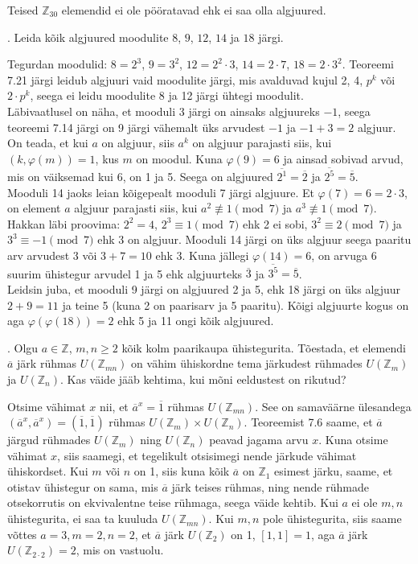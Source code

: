 \documentclass[a4paper, 10pt]{article}
\newcommand{\Z}{\mathbb{Z}}
\newcommand{\w}{\overline}
\begin{document}
Teised $\Z_{30}$ elemendid ei ole pööratavad ehk ei saa olla algjuured.
\bigskip
\pagebreak

. Leida kõik algjuured moodulite $8$, $9$, $12$, $14$ ja $18$ järgi. 

\bigskip
Tegurdan moodulid: $8=2^3$, $9=3^2$, $12=2^2\cdot3$, $14=2\cdot7$, $18=2\cdot3^2$. Teoreemi 7.21 järgi leidub algjuuri vaid moodulite järgi, mis avalduvad kujul 2, 4, $p^k$ või $2\cdot p^k$, seega ei leidu moodulite 8 ja 12 järgi ühtegi moodulit.\\
\indent Läbivaatlusel on näha, et mooduli 3 järgi on ainsaks algjuureks $-1$, seega teoreemi 7.14 järgi on 9 järgi vähemalt üks arvudest $-1$ ja $-1+3=2$ algjuur. On teada, et kui $a$ on algjuur, siis $a^k$ on algjuur parajasti siis, kui $(k,\varphi(m))=1$, kus $m$ on moodul. Kuna $\varphi(9)=6$ ja ainsad sobivad arvud, mis on väiksemad kui 6, on 1 ja 5. Seega on algjuured $\w{2^1}=\w2$ ja $\w{2^5}=\w5$.\\
\indent Mooduli 14 jaoks leian kõigepealt mooduli 7 järgi algjuure. Et $\varphi(7)=6=2\cdot3$, on element $a$ algjuur parajasti siis, kui $a^2\not\equiv1\pmod7$ ja $a^3\not\equiv1\pmod7$. Hakkan läbi proovima: $2^2=4$, $2^3\equiv1\pmod7$ ehk 2 ei sobi, $3^2\equiv2\pmod7$ ja $3^3\equiv-1\pmod7$ ehk 3 on algjuur. Mooduli 14 järgi on üks algjuur seega paaritu arv arvudest 3 või $3+7=10$ ehk 3. Kuna jällegi $\varphi(14)=6$, on arvuga 6 suurim ühistegur arvudel 1 ja 5 ehk algjuurteks $\w3$ ja $\w{3^5}=\w5$.\\
\indent Leidsin juba, et mooduli 9 järgi on algjuured 2 ja 5, ehk 18 järgi on üks algjuur $2+9=11$ ja teine 5 (kuna 2 on paarisarv ja 5 paaritu). Kõigi algjuurte kogus on aga $\varphi(\varphi(18))=2$ ehk 5 ja 11 ongi kõik algjuured.
\bigskip

. Olgu $a\in\Z$, $m,n\geq 2$ kõik kolm paarikaupa ühistegurita. Tõestada, et elemendi $\overline{a}$ järk rühmas $U(\Z_{mn})$ on vähim ühiskordne tema järkudest rühmades $U(\Z_{m})$ ja $U(\Z_{n})$. Kas väide jääb kehtima, kui mõni eeldustest on rikutud?

\bigskip
Otsime vähimat $x$ nii, et $\w{a}^x=\w{1}$ rühmas $ U(\Z_{mn}) $. See on samaväärne ülesandega $(\w{a}^x,\w{a}^x)=(\w{1},\w{1})$ rühmas $U(\Z_{m}) \times U(\Z_{n})$. Teoreemist 7.6 saame, et $\w{a}$ järgud rühmades $U(\Z_{m})$ ning $U(\Z_{n})$ peavad jagama arvu $x$. Kuna otsime vähimat $x$, siis saamegi, et tegelikult otsisimegi nende järkude vähimat ühiskordset. Kui $m$ või $n$ on 1, siis kuna kõik $\w{a}$ on $\Z_1$ esimest järku, saame, et otistav ühistegur on sama, mis  $\w{a}$ järk teises rühmas, ning nende rühmade otsekorrutis on ekvivalentne teise rühmaga, seega väide kehtib. Kui $a$ ei ole $m,n$ ühistegurita, ei saa ta kuuluda  $ U(\Z_{mn}) $. Kui $m,n$ pole ühistegurita, siis saame võttes $a=3,m=2,n=2$, et $\w{a}$ järk $U(\Z_2)$ on 1, $[1,1]=1$, aga $\w{a}$ järk $U(\Z_{2\cdot 2})=2$, mis on vastuolu.
\end{document}
